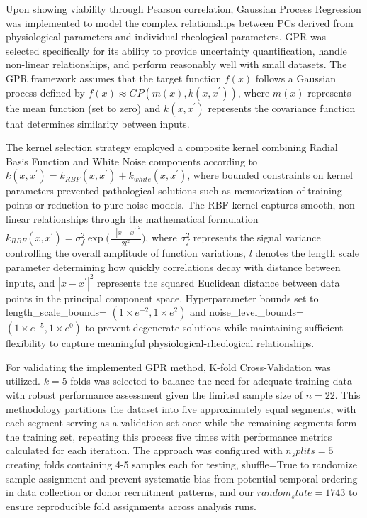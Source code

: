 \documentclass[12pt,letterpaper]{article}
\begin{document}
Upon showing viability through Pearson correlation, Gaussian Process Regression was implemented to model the complex relationships between PCs derived from physiological
parameters and individual rheological parameters. GPR was selected specifically for its ability to provide uncertainty quantification, handle non-linear relationships,
and perform reasonably well with small datasets. The GPR framework assumes that the target function $f(x)$ follows a Gaussian process defined by $f(x) \approx GP(m(x), k(x,x^{\prime}))$,
where $m(x)$ represents the mean function (set to zero) and $k(x,x^{\prime})$ represents the covariance function that determines similarity between inputs.

The kernel selection strategy employed a composite kernel combining Radial Basis Function and White Noise components according to $k(x,x^\prime)=k_{RBF}(x,x^\prime)+k_{white}(x,x^\prime)$,
where bounded constraints on kernel parameters prevented pathological solutions such as memorization of training points or reduction to pure noise models. The RBF kernel captures smooth,
non-linear relationships through the mathematical formulation $k_{RBF}(x,x^{\prime}) = \sigma^2_f \exp\Big(\frac{-|x-x^{\prime}|^2}{2l^2}\Big)$, where $\sigma^2_f $
represents the signal variance controlling the overall amplitude of function variations, $l$ denotes the length scale parameter determining how quickly correlations decay with
distance between inputs, and $|x-x^{\prime}|^2$ represents the squared Euclidean distance between data points in the principal component space. Hyperparameter bounds set to
length\_scale\_bounds= $(1\times e^{-2}, 1\times e^2)$ and noise\_level\_bounds= $(1\times e^{-5}, 1\times e^0)$ to prevent degenerate solutions while maintaining sufficient
flexibility to capture meaningful physiological-rheological relationships.

For validating the implemented GPR method, K-fold Cross-Validation was utilized. $k=5$ folds was selected to balance the need for adequate training data with robust
performance assessment given the limited sample size of $n=22$. This methodology partitions the dataset into five approximately equal segments, with each segment serving
as a validation set once while the remaining segments form the training set, repeating this process five times with performance metrics calculated for each iteration.
The approach was configured with $n_splits=5$ creating folds containing 4-5 samples each for testing, shuffle=True to randomize sample assignment and prevent systematic
bias from potential temporal ordering in data collection or donor recruitment patterns, and our $random_state=1743$ to ensure reproducible fold assignments across analysis runs.
\end{document}
